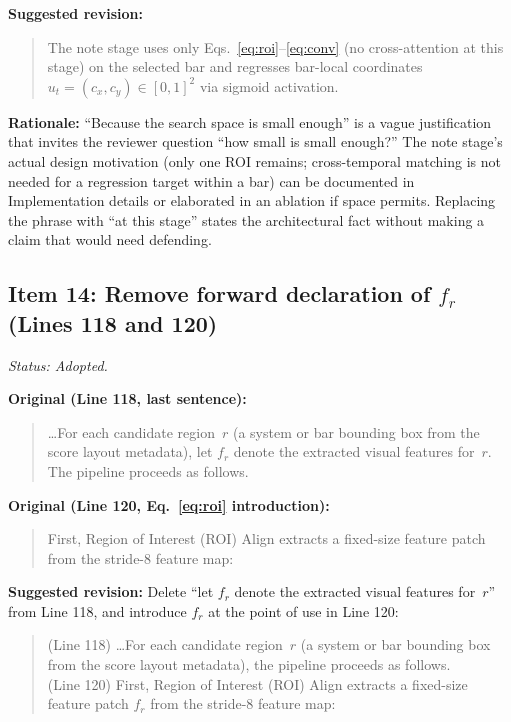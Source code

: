 \documentclass{article}
\begin{document}
\textbf{Suggested revision:}
\begin{quote}
The note stage uses only Eqs.~\ref{eq:roi}--\ref{eq:conv} (no cross-attention at this stage) on the selected bar and regresses bar-local coordinates $u_t = (c_x, c_y) \in [0,1]^2$ via sigmoid activation.
\end{quote}

\textbf{Rationale:}
``Because the search space is small enough'' is a vague justification that invites the reviewer question ``how small is small enough?'' The note stage's actual design motivation (only one ROI remains; cross-temporal matching is not needed for a regression target within a bar) can be documented in Implementation details or elaborated in an ablation if space permits. Replacing the phrase with ``at this stage'' states the architectural fact without making a claim that would need defending.

\subsection*{Item 14: Remove forward declaration of $f_r$ (Lines 118 and 120)}

\textit{Status: Adopted.}

\textbf{Original (Line 118, last sentence):}
\begin{quote}
\ldots For each candidate region~$r$ (a system or bar bounding box from the score layout metadata), let $f_r$ denote the extracted visual features for~$r$. The pipeline proceeds as follows.
\end{quote}

\textbf{Original (Line 120, Eq.~\ref{eq:roi} introduction):}
\begin{quote}
First, Region of Interest (ROI) Align \cite{he2017mask} extracts a fixed-size feature patch from the stride-8 feature map:
\end{quote}

\textbf{Suggested revision:}
Delete ``let $f_r$ denote the extracted visual features for~$r$'' from Line 118, and introduce $f_r$ at the point of use in Line 120:
\begin{quote}
(Line 118) \ldots For each candidate region~$r$ (a system or bar bounding box from the score layout metadata), the pipeline proceeds as follows.\\[4pt]
(Line 120) First, Region of Interest (ROI) Align \cite{he2017mask} extracts a fixed-size feature patch $f_r$ from the stride-8 feature map:
\end{quote}
\end{document}
